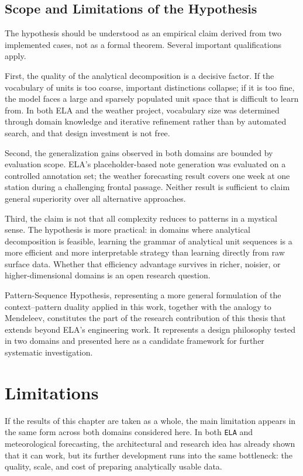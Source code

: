 \documentclass[12pt,a4paper,oneside]{report}
\begin{document}
\subsection*{Scope and Limitations of the Hypothesis}

The hypothesis should be understood as an empirical claim derived from two implemented
cases, not as a formal theorem. Several important qualifications apply.

First, the quality of the analytical decomposition is a decisive factor. If the vocabulary
of units is too coarse, important distinctions collapse; if it is too fine, the model faces
a large and sparsely populated unit space that is difficult to learn from. In both ELA and
the weather project, vocabulary size was determined through domain knowledge and iterative
refinement rather than by automated search, and that design investment is not free.

Second, the generalization gains observed in both domains are bounded by evaluation scope.
ELA's placeholder-based note generation was evaluated on a controlled annotation set; the
weather forecasting result covers one week at one station during a challenging frontal
passage. Neither result is sufficient to claim general superiority over all alternative
approaches.

Third, the claim is not that all complexity reduces to patterns in a mystical sense. The
hypothesis is more practical: in domains where analytical decomposition is feasible, learning
the grammar of analytical unit sequences is a more efficient and more interpretable strategy
than learning directly from raw surface data. Whether that efficiency advantage survives in
richer, noisier, or higher-dimensional domains is an open research question.

Pattern-Sequence Hypothesis, representing a more general formulation of the
context--pattern duality applied in this work, together with the analogy to Mendeleev,
constitutes the part of the research contribution of this thesis that extends beyond ELA's
engineering work. It represents a design philosophy tested in two domains and presented
here as a candidate framework for further systematic investigation.

\section{Limitations}
If the results of this chapter are taken as a whole, the main limitation appears in the same form across both domains considered here. In both \texttt{ELA} and meteorological forecasting, the architectural and research idea has already shown that it can work, but its further development runs into the same bottleneck: the quality, scale, and cost of preparing analytically usable data.
\end{document}
